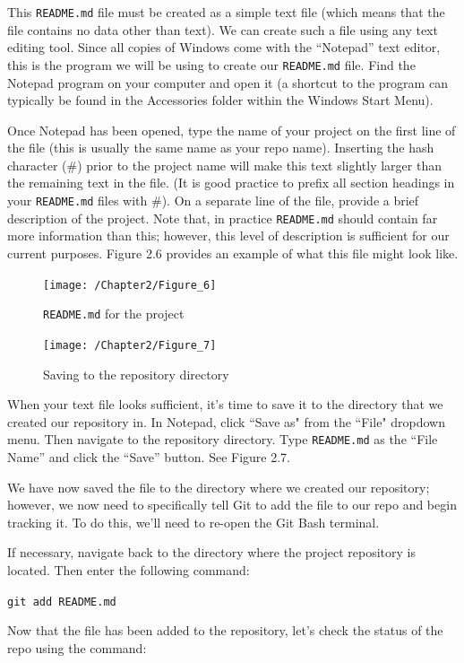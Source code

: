 \documentclass{book}
\begin{document}
This \texttt{README.md} file must be created as a simple text file (which means that the file contains no data other than text). We can create such a file using any text editing tool. Since all copies of Windows come with the ``Notepad'' text editor, this is the program we will be using to create our \texttt{README.md} file. Find the Notepad program on your computer and open it (a shortcut to the program can typically be found in the Accessories folder within the Windows Start Menu).

Once Notepad has been opened, type the name of your project on the first line of the file (this is usually the same name as your repo name). Inserting the hash character (\#) prior to the project name will make this text slightly larger than the remaining text in the file. (It is good practice to prefix all section headings in your \texttt{README.md} files with \#). On a separate line of the file, provide a brief description of the project. Note that, in practice \texttt{README.md} should contain far more information than this; however, this level of description is sufficient for our current purposes. Figure 2.6 provides an example of what this file might look like.

\begin{figure}[h]
	\caption{\texttt{README.md} for the project}
	\centering\texttt{[image: /Chapter2/Figure\_6]}
\end{figure}

\begin{figure}[h]
	\caption{Saving to the repository directory}
	\centering\texttt{[image: /Chapter2/Figure\_7]}
\end{figure}

When your text file looks sufficient, it's time to save it to the directory that we created our repository in. In Notepad, click ``Save as" from the ``File" dropdown menu. Then navigate to the repository directory. Type \texttt{README.md} as the ``File Name'' and click the ``Save'' button. See Figure 2.7.

We have now saved the file to the directory where we created our repository; however, we now need to specifically tell Git to add the file to our repo and begin tracking it. To do this, we'll need to re-open the Git Bash terminal. 

If necessary, navigate back to the directory where the project repository is located. Then enter the following command:

\texttt{git add README.md}

Now that the file has been added to the repository, let's check the status of the repo using the command:
\end{document}
